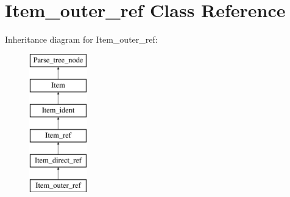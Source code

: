 \hypertarget{classItem__outer__ref}{}\section{Item\+\_\+outer\+\_\+ref Class Reference}
\label{classItem__outer__ref}
Inheritance diagram for Item\+\_\+outer\+\_\+ref\+:\begin{figure}[H]
\begin{center}
\leavevmode
\includegraphics[height=6.000000cm]{classItem__outer__ref}
\end{center}
\end{figure}
